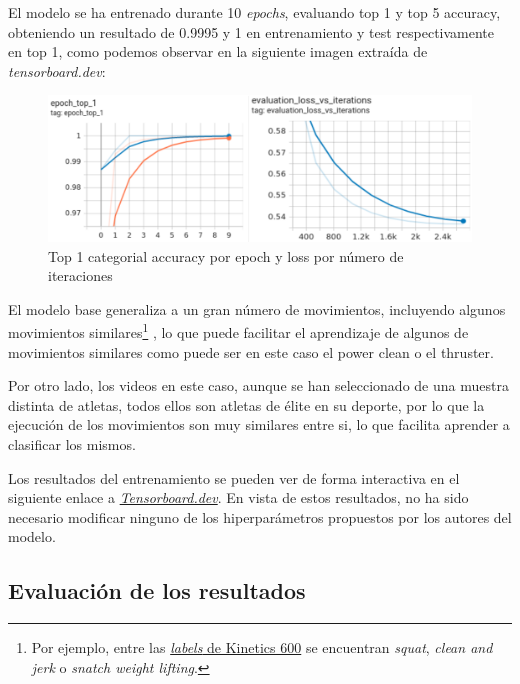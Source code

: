 El modelo se ha entrenado durante 10 \textit{epochs}, evaluando top 1 y top 5 accuracy, obteniendo un resultado de 0.9995 y 1 en entrenamiento y test respectivamente en top 1, como podemos observar en la siguiente imagen extraída de \textit{tensorboard.dev}:

\begin{figure}[H]
    \centering
		\includegraphics[width=\textwidth]{figs/tensorboard_training.png}
\caption{Top 1 categorial accuracy por epoch y loss por número de iteraciones}\label{training}
\end{figure}

El modelo base generaliza a un gran número de movimientos, incluyendo algunos movimientos similares\footnote{Por ejemplo, entre las  \href{https://raw.githubusercontent.com/tensorflow/models/f8af2291cced43fc9f1d9b41ddbf772ae7b0d7d2/official/projects/movinet/files/kinetics_600_labels.txt}{\textit{labels} de Kinetics 600} se encuentran \textit{squat}, \textit{clean and jerk} o \textit{snatch weight lifting}.} , lo que puede facilitar el aprendizaje de algunos de movimientos similares como puede ser en este caso el power clean o el thruster.

Por otro lado, los videos en este caso, aunque se han seleccionado de una muestra distinta de atletas, todos ellos son atletas de élite en su deporte, por lo que la ejecución de los movimientos son muy similares entre si, lo que facilita aprender a clasificar los mismos.

Los resultados del entrenamiento se pueden ver de forma interactiva en el siguiente enlace a \href{https://tensorboard.dev/experiment/UXyupsnMQ2S74vdul3vdbw/#scalars}{\textit{Tensorboard.dev}}. En vista de estos resultados, no ha sido necesario modificar ninguno de los hiperparámetros propuestos por los autores del modelo.


\subsection{Evaluación de los resultados}

